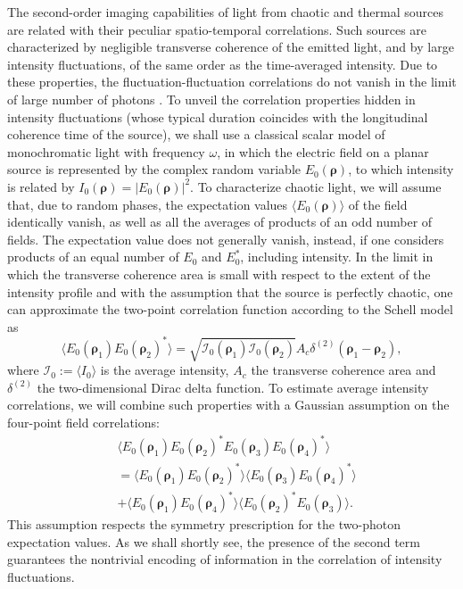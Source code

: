 \documentclass[aps,pra,amssymb,twocolumn,amsmath,superscriptaddress,showpacs,10pt]{revtex4-1}
\def\I{\mathcal{I}}
\begin{document}
The second-order imaging capabilities of light from chaotic and thermal sources are related with their peculiar spatio-temporal correlations. Such sources are characterized by negligible transverse coherence of the emitted light, and by large intensity fluctuations, of the same order as the time-averaged intensity. Due to these properties, the fluctuation-fluctuation correlations do not vanish in the limit of large number of photons \cite{mandel}. To unveil the correlation properties hidden in intensity fluctuations (whose typical duration coincides with the longitudinal coherence time of the source), we shall use a classical scalar model of monochromatic light with frequency $\omega$, in which the electric field on a planar source is represented by the complex random variable $E_0(\bm{\rho})$, to which intensity is related by $I_0(\bm{\rho})=|E_0(\bm{\rho})|^2$. To characterize chaotic light, we will assume that, due to random phases, the expectation values $\langle E_0(\bm{\rho}) \rangle$ of the field identically vanish,
as well as all the averages of products of an odd number of fields. The expectation value does not generally vanish, instead, if one considers products of an equal number of $E_0$ and $E_0^*$, including intensity. In the limit in which the transverse coherence area is small with respect to the extent of the intensity profile and with the assumption that the source is perfectly chaotic, one can approximate the two-point correlation function according to the Schell model \cite{mandel} as
\begin{equation}
\langle E_0(\bm{\rho}_1) E_0(\bm{\rho}_2)^* \rangle = \sqrt{ \I_0(\bm{\rho}_1) \I_0(\bm{\rho}_2) } A_c \delta^{(2)} (\bm{\rho}_1-\bm{\rho}_2),
\end{equation}
where $\I_0 := \langle I_0 \rangle$ is the average intensity, $A_c$ the transverse coherence area and $\delta^{(2)}$ the two-dimensional Dirac delta function. To estimate average intensity correlations, we will combine such properties with a Gaussian assumption on the four-point field correlations:
\begin{align}\label{4pointgauss}
& \langle E_0(\bm{\rho}_1) E_0(\bm{\rho}_2)^* E_0(\bm{\rho}_3) E_0(\bm{\rho}_4)^* \rangle \nonumber \\ & = \langle E_0(\bm{\rho}_1) E_0(\bm{\rho}_2)^* \rangle \langle E_0(\bm{\rho}_3) E_0(\bm{\rho}_4)^* \rangle \nonumber \\ & + \langle E_0(\bm{\rho}_1) E_0(\bm{\rho}_4)^* \rangle \langle E_0(\bm{\rho}_2)^* E_0(\bm{\rho}_3) \rangle.
\end{align}
This assumption respects the symmetry prescription for the two-photon expectation values. As we shall shortly see, the presence of the second term guarantees the nontrivial encoding of information in the correlation of intensity fluctuations.
\end{document}

